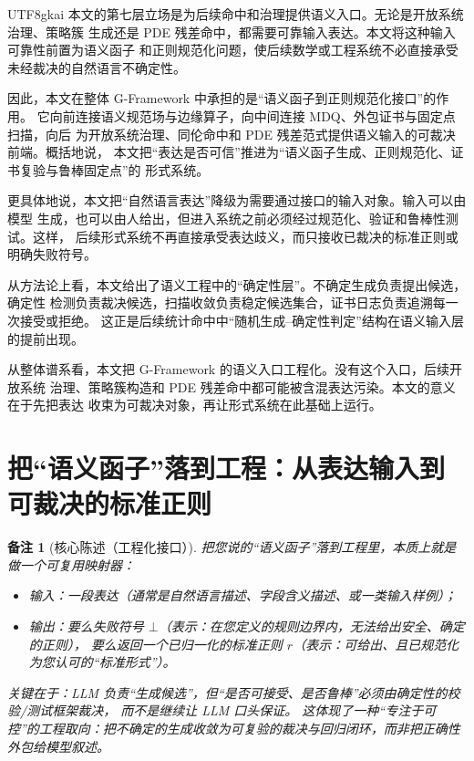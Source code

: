 \documentclass[12pt]{article}
\newtheorem{remark}{备注}[section]
\newcommand{\GFramework}{\textsf{G-Framework}}
\begin{document}
\begin{CJK*}{UTF8}{gkai}
本文的第七层立场是为后续命中和治理提供语义入口。无论是开放系统治理、策略簇
生成还是 PDE 残差命中，都需要可靠输入表达。本文将这种输入可靠性前置为语义函子
和正则规范化问题，使后续数学或工程系统不必直接承受未经裁决的自然语言不确定性。

因此，本文在整体 \GFramework{} 中承担的是“语义函子到正则规范化接口”的作用。
它向前连接语义规范场与边缘算子，向中间连接 MDQ、外包证书与固定点扫描，向后
为开放系统治理、同伦命中和 PDE 残差范式提供语义输入的可裁决前端。概括地说，
本文把“表达是否可信”推进为“语义函子生成、正则规范化、证书复验与鲁棒固定点”的
形式系统。

更具体地说，本文把“自然语言表达”降级为需要通过接口的输入对象。输入可以由模型
生成，也可以由人给出，但进入系统之前必须经过规范化、验证和鲁棒性测试。这样，
后续形式系统不再直接承受表达歧义，而只接收已裁决的标准正则或明确失败符号。

从方法论上看，本文给出了语义工程中的“确定性层”。不确定生成负责提出候选，确定性
检测负责裁决候选，扫描收敛负责稳定候选集合，证书日志负责追溯每一次接受或拒绝。
这正是后续统计命中中“随机生成--确定性判定”结构在语义输入层的提前出现。

从整体谱系看，本文把 \GFramework{} 的语义入口工程化。没有这个入口，后续开放系统
治理、策略簇构造和 PDE 残差命中都可能被含混表达污染。本文的意义在于先把表达
收束为可裁决对象，再让形式系统在此基础上运行。

\setcounter{tocdepth}{3}
\setcounter{secnumdepth}{3}
\tableofcontents
\clearpage

\section{把“语义函子”落到工程：从表达输入到可裁决的标准正则}
\label{sec:semantic-functor-regex-interface}

\begin{remark}[核心陈述（工程化接口）]
把您说的“语义函子”落到工程里，本质上就是做一个可复用映射器：
\begin{itemize}
  \item 输入：一段表达（通常是自然语言描述、字段含义描述、或一类输入样例）；
  \item 输出：要么失败符号 $\bot$（表示：在您定义的规则边界内，无法给出安全、确定的正则），
  要么返回一个已归一化的标准正则 $r$（表示：可给出、且已规范化为您认可的“标准形式”）。
\end{itemize}
关键在于：LLM 负责“生成候选”，但“是否可接受、是否鲁棒”必须由确定性的校验/测试框架裁决，
而不是继续让 LLM 口头保证。
这体现了一种“专注于可控”的工程取向：把不确定的生成收敛为可复验的裁决与回归闭环，而非把正确性外包给模型叙述\cite{gaozheng-analytic-ai}。
\end{remark}


\end{CJK*}
\end{document}
